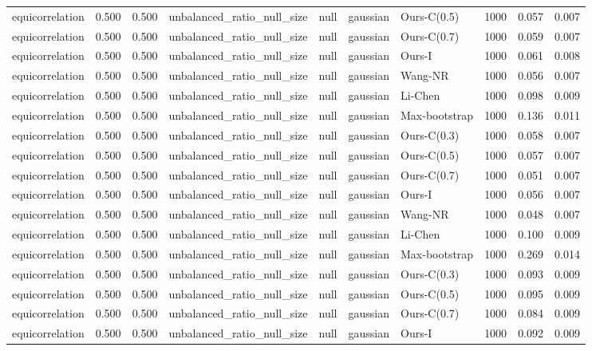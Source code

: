 \begin{tabular}{lrrllllrrr}
equicorrelation & 0.500 & 0.500 & unbalanced\_ratio\_null\_size & null & gaussian & Ours-C(0.5) & 1000 & 0.057 & 0.007 \\
equicorrelation & 0.500 & 0.500 & unbalanced\_ratio\_null\_size & null & gaussian & Ours-C(0.7) & 1000 & 0.059 & 0.007 \\
equicorrelation & 0.500 & 0.500 & unbalanced\_ratio\_null\_size & null & gaussian & Ours-I & 1000 & 0.061 & 0.008 \\
equicorrelation & 0.500 & 0.500 & unbalanced\_ratio\_null\_size & null & gaussian & Wang-NR & 1000 & 0.056 & 0.007 \\
equicorrelation & 0.500 & 0.500 & unbalanced\_ratio\_null\_size & null & gaussian & Li-Chen & 1000 & 0.098 & 0.009 \\
equicorrelation & 0.500 & 0.500 & unbalanced\_ratio\_null\_size & null & gaussian & Max-bootstrap & 1000 & 0.136 & 0.011 \\
equicorrelation & 0.500 & 0.500 & unbalanced\_ratio\_null\_size & null & gaussian & Ours-C(0.3) & 1000 & 0.058 & 0.007 \\
equicorrelation & 0.500 & 0.500 & unbalanced\_ratio\_null\_size & null & gaussian & Ours-C(0.5) & 1000 & 0.057 & 0.007 \\
equicorrelation & 0.500 & 0.500 & unbalanced\_ratio\_null\_size & null & gaussian & Ours-C(0.7) & 1000 & 0.051 & 0.007 \\
equicorrelation & 0.500 & 0.500 & unbalanced\_ratio\_null\_size & null & gaussian & Ours-I & 1000 & 0.056 & 0.007 \\
equicorrelation & 0.500 & 0.500 & unbalanced\_ratio\_null\_size & null & gaussian & Wang-NR & 1000 & 0.048 & 0.007 \\
equicorrelation & 0.500 & 0.500 & unbalanced\_ratio\_null\_size & null & gaussian & Li-Chen & 1000 & 0.100 & 0.009 \\
equicorrelation & 0.500 & 0.500 & unbalanced\_ratio\_null\_size & null & gaussian & Max-bootstrap & 1000 & 0.269 & 0.014 \\
equicorrelation & 0.500 & 0.500 & unbalanced\_ratio\_null\_size & null & gaussian & Ours-C(0.3) & 1000 & 0.093 & 0.009 \\
equicorrelation & 0.500 & 0.500 & unbalanced\_ratio\_null\_size & null & gaussian & Ours-C(0.5) & 1000 & 0.095 & 0.009 \\
equicorrelation & 0.500 & 0.500 & unbalanced\_ratio\_null\_size & null & gaussian & Ours-C(0.7) & 1000 & 0.084 & 0.009 \\
equicorrelation & 0.500 & 0.500 & unbalanced\_ratio\_null\_size & null & gaussian & Ours-I & 1000 & 0.092 & 0.009 \\

\end{tabular}

